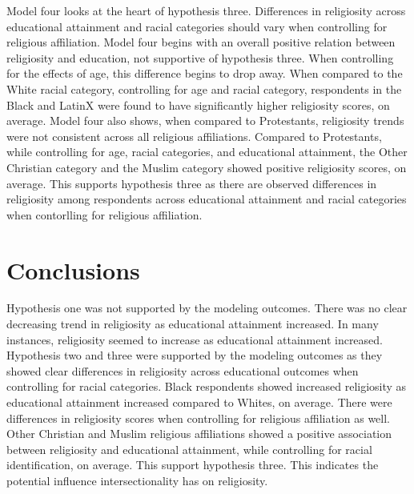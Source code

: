 \documentclass[
  12pt,
  letterpaper,
]{article}
\begin{document}
Model four looks at the heart of hypothesis three. Differences in
religiosity across educational attainment and racial categories should
vary when controlling for religious affiliation. Model four begins with
an overall positive relation between religiosity and education, not
supportive of hypothesis three. When controlling for the effects of age,
this difference begins to drop away. When compared to the White racial
category, controlling for age and racial category, respondents in the
Black and LatinX were found to have significantly higher religiosity
scores, on average. Model four also shows, when compared to Protestants,
religiosity trends were not consistent across all religious
affiliations. Compared to Protestants, while controlling for age, racial
categories, and educational attainment, the Other Christian category and
the Muslim category showed positive religiosity scores, on average. This
supports hypothesis three as there are observed differences in
religiosity among respondents across educational attainment and racial
categories when contorlling for religious affiliation.

\hypertarget{conclusions}{%
\section{Conclusions}\label{conclusions}}

Hypothesis one was not supported by the modeling outcomes. There was no
clear decreasing trend in religiosity as educational attainment
increased. In many instances, religiosity seemed to increase as
educational attainment increased. Hypothesis two and three were
supported by the modeling outcomes as they showed clear differences in
religiosity across educational outcomes when controlling for racial
categories. Black respondents showed increased religiosity as
educational attainment increased compared to Whites, on average. There
were differences in religiosity scores when controlling for religious
affiliation as well. Other Christian and Muslim religious affiliations
showed a positive association between religiosity and educational
attainment, while controlling for racial identification, on average.
This support hypothesis three. This indicates the potential influence
intersectionality has on religiosity.
\end{document}
